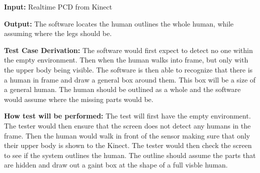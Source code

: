 \documentclass[12pt, titlepage]{article}
\begin{document}
\begin{enumerate}
  \textbf{Input:} Realtime PCD from Kinect
  
  \textbf{Output:} The software locates the human outlines the whole human, while assuming where the legs should be. 
  
  \textbf{Test Case Derivation:} The software would first expect to detect no one within the empty environment. Then when the human walks into frame, but only with the upper body being visible. The software is then able to recognize that there is a human in frame and draw a general box around them. This box will be a size of a general human. The human should be outlined as a whole and the software would assume where the missing parts would be.
  
  \textbf{How test will be performed:} The test will first have the empty environment. The tester would then ensure that the screen does not detect any humans in the frame. Then the human would walk in front of the sensor making sure that only their upper body is shown to the Kinect. The tester would then check the screen to see if the system outlines the human. The outline should assume the parts that are hidden and draw out a gaint box at the shape of a full visble human.
    
\end{enumerate}
\end{document}
